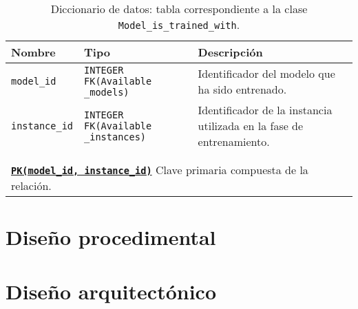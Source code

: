 \begin{itemize}
		\begin{table}
		\small
		\begin{centering}
			\begin{tabular}{@{}p{7em} p{7em} p{18em}@{}}
				\toprule
				\textbf{Nombre} & \textbf{Tipo} & \textbf{Descripción}\\
				\midrule
				\texttt{model\_id} & \texttt{INTEGER FK(Available \_models)} & Identificador del modelo que ha sido entrenado. \\
				\texttt{instance\_id} & \texttt{INTEGER FK(Available \_instances)} & Identificador de la instancia utilizada en la fase de entrenamiento. \\\\\\
				\multicolumn{3}{l}{\texttt{\textbf{\underline{PK(model\_id, instance\_id)}}} Clave primaria compuesta de la relación.} \\
				\bottomrule
			\end{tabular}
		\end{centering}
		\caption[Diccionario de datos: Model\_is\_trained\_with]{Diccionario de datos: tabla correspondiente a la clase \texttt{Model\_is\_trained\_with}.}
		\label{datadic:modeltrainedwith}
	\end{table}
\end{itemize}

\section{Diseño procedimental}

\section{Diseño arquitectónico}


